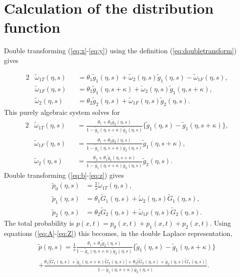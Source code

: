 \documentclass[]{agujournal2018}
\newcommand\tom{\tilde{\omega}}
\newcommand\tg{\tilde{g}}
\newcommand\tp{\tilde{p}}
\newcommand\tG{\tilde{G}}
\begin{document}
 




 


\appendix

\section{Calculation of the distribution function}
\label{sec:appendixA}
Double transforming (\ref{eq:x}-\ref{eq:y}) using the definition (\ref{eq:doubletransform}) gives

\begin{alignat}{2}
&\tom_{1T}(\eta,s) &&= \theta_1 \tg_1(\eta,s) + \tom_2(\eta,s)\tg_1(\eta,s)-\tom_{1F}(\eta,s),\\
&\tom_{1F}(\eta,s) &&= \theta_1\tg_1(\eta,s+\kappa) + \tom_2(\eta,s)\tg_1(\eta,s+\kappa),\\
&\tom_2(\eta,s) &&= \theta_2 \tg_2(\eta,s) + \tom_{1F}(\eta,s)\tg_2(\eta,s).
\end{alignat}
This purely algebraic system solves for 
\begin{alignat}{2}
&\tom_{1T}(\eta,s) &&= \frac{\theta_1 + \theta_2 \tg_2(\eta,s)}{1-\tg_1(\eta,s+\kappa)\tg_2(\eta,s)}\big\{\tg_1(\eta,s)-\tg_1(\eta,s+\kappa) \big\}, \label{eq:A} \\
&\tom_{1F}(\eta,s) &&= \frac{\theta_1 + \theta_2 \tg_2(\eta,s)}{1-\tg_1(\eta,s+\kappa)\tg_2(\eta,s)}\tg_1(\eta,s+\kappa),\\
&\tom_{2}(\eta,s) &&= \frac{\theta_2 + \theta_1 \tg_1(\eta,s+\kappa)}{1-\tg_1(\eta,s+\kappa)\tg_2(\eta,s)}\tg_2(\eta,s). 
\end{alignat}
Double transforming (\ref{eq:b}-\ref{eq:z}) gives
\begin{align}
\tp_0(\eta,s) &= \frac{1}{s}\tom_{1T}(\eta,s),\\
\tp_1(\eta,s) &= \theta_1 \tG_1(\eta,s) + \tom_2(\eta,s) \tG_1(\eta,s),\\
\tp_2(\eta,s) &= \theta_2 \tG_2(\eta,s) + \tom_{1F}(\eta,s)\tG_2(\eta,s).\label{eq:Z}
\end{align}
The total probability is $p(x,t) = p_0(x,t) + p_1(x,t) + p_2(x,t)$. Using equations (\ref{eq:A}-\ref{eq:Z}) this becomes, in the double Laplace representation, 
\begin{multline}
\tp(\eta,s) = \frac{1}{s}\frac{\theta_1 + \theta_2 \tg_2(\eta,s)}{1-\tg_1(\eta,s+\kappa)\tg_2(\eta,s)}\big\{\tg_1(\eta,s)-\tg_1(\eta,s+\kappa) \big\} \\
+\frac{\theta_1\big[\tG_1(\eta,s) + \tg_1(\eta,s+\kappa)\tG_2(\eta,s)\big]+ \theta_2\big[\tG_2(\eta,s) + \tg_2(\eta,s)\tG_1(\eta,s)\big]}{1-\tg_1(\eta,s+\kappa)\tg_2(\eta,s)}. \\
\label{eq:lap}
\end{multline}
\end{document}
